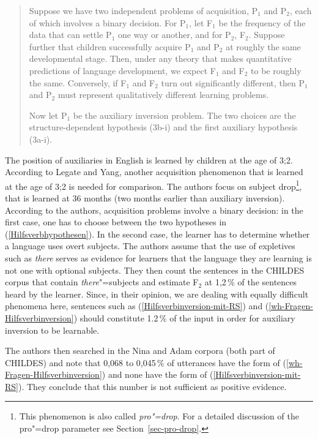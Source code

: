 \begin{quote}
   Suppose we have two independent problems of acquisition, P$_1$ and P$_2$, each
of which involves a binary decision. For P$_1$, let F$_1$ be the frequency of the
data that can settle P$_1$ one way or another, and for P$_2$, F$_2$. Suppose further
that children successfully acquire P$_1$ and P$_2$ at roughly the same developmental
stage. Then, under any theory that makes quantitative predictions of language
development, we expect F$_1$ and F$_2$ to be roughly the same. Conversely, if F$_1$ and
F$_2$ turn out significantly different, then P$_1$ and P$_2$ must represent qualitatively
different learning problems.

   Now let P$_1$ be the auxiliary inversion problem. The two choices are the
structure-dependent hypothesis (3b-i) and the first auxiliary hypothesis (3a-i). \citep[]{LY2002a}
\end{quote}

\noindent
The position of auxiliaries in English is learned by children at the age of 3;2. According to Legate
and Yang, another acquisition phenomenon that is learned at the age of 3;2 is needed for
comparison. The authors focus on subject drop\footnote{
  This phenomenon is also called \emph{pro"=drop}. For a detailed discussion of the pro"=drop
  parameter see Section~\ref{sec-pro-drop}.
}, that is learned
at 36 months (two months earlier than auxiliary inversion). According to the authors, acquisition problems involve a binary decision:
in the first case, one has to choose between the two hypotheses in (\ref{Hilfsverbhypothesen}). In the second case, the learner has to determine
whether a language uses overt subjects. The authors assume that the use of expletives such as \emph{there} serves as
evidence for learners that the language they are learning is not one with optional subjects. They then count the sentences in the CHILDES corpus
that contain \emph{there}"=subjects and estimate F$_2$ at 1,2\,\% of the sentences heard by the learner.
Since, in their opinion, we are dealing with equally difficult phenomena here, sentences such as (\ref{Hilfsverbinversion-mit-RS}) and (\ref{wh-Fragen-Hilfsverbinversion})
should constitute 1.2\,\% of the input in order for auxiliary inversion to be learnable.

The authors then searched in the Nina and Adam corpora (both part of CHILDES) and note that 0,068 to 0,045\,\% of utterances have the form of
(\ref{wh-Fragen-Hilfsverbinversion}) and none have the form of (\ref{Hilfsverbinversion-mit-RS}). They conclude that this number is not sufficient as positive evidence.

